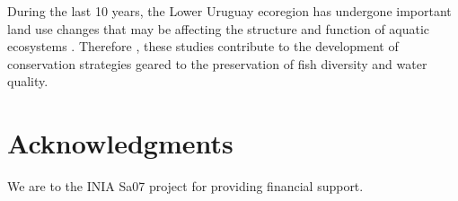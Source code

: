 \documentclass[authoryear,preprint,review,12pt]{elsarticle} %
\begin{document}
\justifying

During the last 10 years, the Lower Uruguay ecoregion has undergone important land use changes that may be affecting the structure and function of aquatic ecosystems \citep{cespedes-payret_irruption_2009}. Therefore , these studies contribute to the development of conservation strategies geared to the preservation of fish diversity and water quality.


\section{ Acknowledgments}

We are  to the INIA Sa07 project for providing financial support.

 


\newpage
\thispagestyle{empty}
\end{document}
